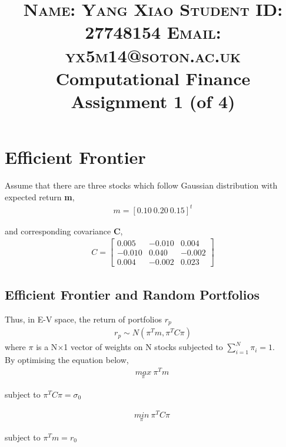 \documentclass[paper=a4, fontsize=11pt]{article} %
\title{	
\normalfont \normalsize 
\textsc{
	Name: Yang Xiao	  \hfill 
	Student ID: 27748154	\hfill
	Email: yx5m14@soton.ac.uk \\ [25pt]} 
\huge Computational Finance Assignment 1 (of 4) \\ %
}
\date{} %
\numberwithin{equation}{section} %
\numberwithin{figure}{section} %
\numberwithin{table}{section} %
\begin{document}
\maketitle %

\section{Efficient Frontier}

Assume that there are three stocks which follow Gaussian distribution with expected return \textbf{m},
\begin{align}
	m = [0.10\ 0.20\ 0.15]^{t}
\end{align}

and corresponding covariance \textbf{C},
\begin{align}
C = \begin{bmatrix}
0.005 & -0.010 & 0.004\\ 
-0.010 &  0.040& -0.002\\ 
0.004&  -0.002& 0.023
\end{bmatrix}
\end{align}


\subsection{Efficient Frontier and Random Portfolios}

Thus, in E-V space, the return of portfolios $r_{p}$
\begin{align}
r_{p}\sim \mathit{N}(\pi^{T}m, \pi^{T}C\pi)
\end{align}
where $\pi$ is a N$\times$1 vector of weights on N stocks subjected to $\sum_{i=1}^{N}\pi_{i}=1$.\\
By optimising the equation below, 
\begin{align}
\underset{\pi}{max}\ \pi^{T} m\ 
\end{align}

subject to $\pi^{T}C\pi=\sigma _{0}$

\begin{align}
\underset{\pi}{min}\  \pi^{T}C\pi\ 
\end{align}

subject to $\pi^{T} m = r_0$ \\
\end{document}
